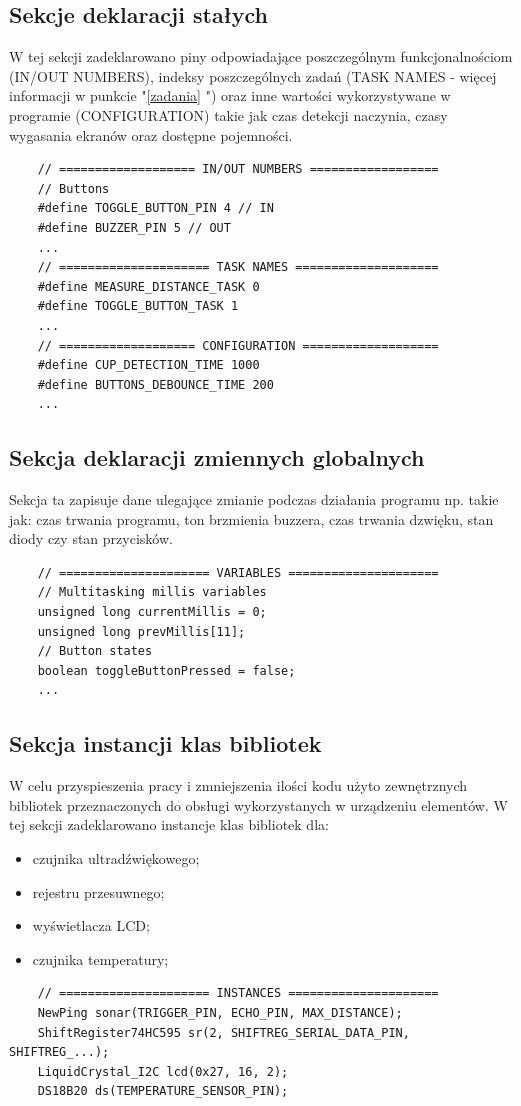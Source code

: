 \documentclass[11pt]{article}
\begin{document}
\subsection{Sekcje deklaracji stałych}
W tej sekcji zadeklarowano piny odpowiadające poszczególnym funkcjonalnościom (IN/OUT NUMBERS), indeksy poszczególnych zadań (TASK NAMES - więcej informacji w punkcie "\ref{zadania} ") oraz inne wartości wykorzystywane w programie (CONFIGURATION) takie jak czas detekcji naczynia, czasy wygasania ekranów oraz dostępne pojemności.
\begin{verbatim}
    // =================== IN/OUT NUMBERS ==================
    // Buttons
    #define TOGGLE_BUTTON_PIN 4 // IN
    #define BUZZER_PIN 5 // OUT
    ...
    // ===================== TASK NAMES ====================
    #define MEASURE_DISTANCE_TASK 0
    #define TOGGLE_BUTTON_TASK 1
    ...
    // =================== CONFIGURATION ===================
    #define CUP_DETECTION_TIME 1000
    #define BUTTONS_DEBOUNCE_TIME 200
    ...
\end{verbatim}

\subsection{Sekcja deklaracji zmiennych globalnych}
Sekcja ta zapisuje dane ulegające zmianie podczas działania programu np. takie jak: czas trwania programu, ton brzmienia buzzera, czas trwania dzwięku, stan diody czy stan przycisków.  
\begin{verbatim}
    // ===================== VARIABLES =====================
    // Multitasking millis variables
    unsigned long currentMillis = 0;
    unsigned long prevMillis[11];
    // Button states
    boolean toggleButtonPressed = false;
    ...
\end{verbatim}

\subsection{Sekcja instancji klas bibliotek}
W celu przyspieszenia pracy i zmniejszenia ilości kodu użyto zewnętrznych bibliotek przeznaczonych do obsługi wykorzystanych w urządzeniu elementów. W tej sekcji zadeklarowano instancje klas bibliotek dla:
\begin{itemize}
    \item czujnika ultradźwiękowego;
    \item rejestru przesuwnego;
    \item wyświetlacza LCD;
    \item czujnika temperatury;
\end{itemize}
\begin{verbatim}
    // ===================== INSTANCES =====================
    NewPing sonar(TRIGGER_PIN, ECHO_PIN, MAX_DISTANCE);
    ShiftRegister74HC595 sr(2, SHIFTREG_SERIAL_DATA_PIN, SHIFTREG_...);
    LiquidCrystal_I2C lcd(0x27, 16, 2);
    DS18B20 ds(TEMPERATURE_SENSOR_PIN);
\end{verbatim}
\end{document}

